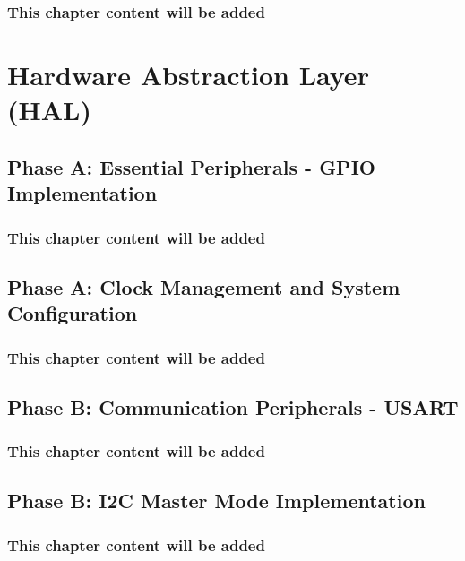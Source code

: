 \documentclass[11pt,a4paper,twoside,openright]{book}
\begin{document}
\section*{This chapter content will be added}
\clearpage

\part{Hardware Abstraction Layer (HAL)}
\label{part:hal}

\chapter{Phase A: Essential Peripherals - GPIO Implementation}
\label{ch:chapter-04}
\section*{This chapter content will be added}
\clearpage

\chapter{Phase A: Clock Management and System Configuration}
\label{ch:chapter-05}
\section*{This chapter content will be added}
\clearpage

\chapter{Phase B: Communication Peripherals - USART}
\label{ch:chapter-06}
\section*{This chapter content will be added}
\clearpage

\chapter{Phase B: I2C Master Mode Implementation}
\label{ch:chapter-07}
\section*{This chapter content will be added}
\clearpage
\end{document}
